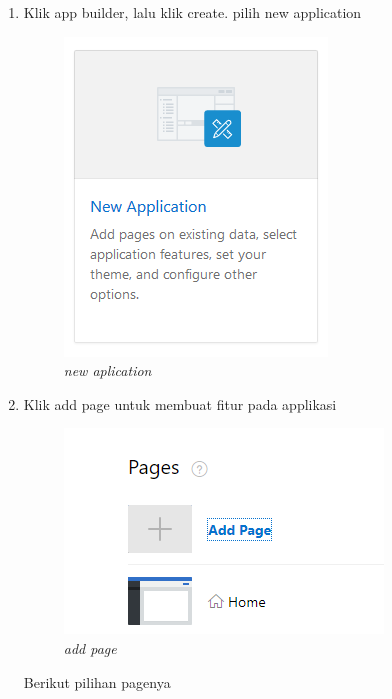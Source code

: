 \begin{enumerate}
    \item Klik app builder, lalu klik create. pilih new application
    \newpage
    \begin{figure}[!htbp]
        \centering
        \includegraphics[scale=0.7]{figure/new_aplication.PNG}
        \caption{\textit{new aplication}}
        \label{fig:my_label}
    \end{figure}
    
    \item Klik add page untuk membuat fitur pada applikasi
    
    \begin{figure}[!htbp]
        \centering
        \includegraphics[scale=0.7]{figure/add_page.PNG}
        \caption{\textit{add page}}
        \label{fig:my_label}
    \end{figure}\par
    
    Berikut pilihan pagenya\par
    

\end{enumerate}
